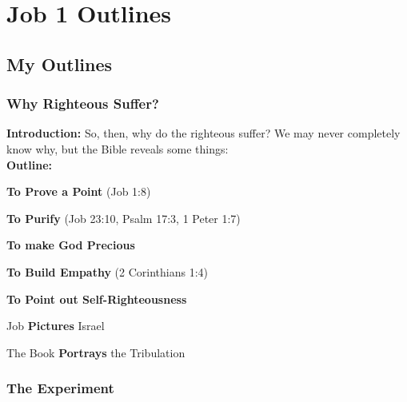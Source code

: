 \section{Job 1 Outlines}

\subsection{My Outlines}

\subsubsection{Why Righteous Suffer?}
\textbf{Introduction:} So, then, why do the righteous suffer? We may never completely know why, but the Bible reveals some things:\\
\textbf{Outline:} 
\begin{compactenum}[I.][19]
    \item  \textbf{To Prove a Point} (Job 1:8)
    \item  \textbf{To Purify} (Job 23:10, Psalm 17:3, 1 Peter 1:7)
    \item \textbf{To make God Precious}
    \item \textbf{To Build Empathy} (2 Corinthians 1:4)
    \item \textbf{To Point out Self-Righteousness}
    \item Job \textbf{Pictures} Israel
    \item The Book \textbf{Portrays} the Tribulation
\end{compactenum}

\subsubsection{The Experiment}

